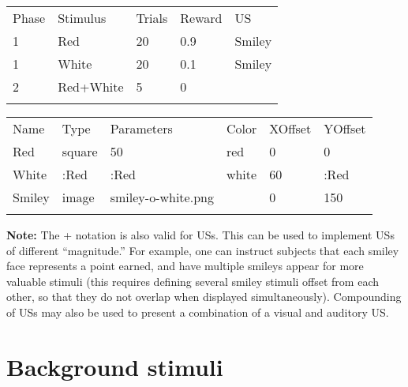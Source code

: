 \documentclass[11pt,]{article}
\renewcommand{\medskip}{}
\begin{document}
\begin{table*}[t]\begin{center}\small\begin{tabular}{@{}lllll@{}}
\hline\noalign{\medskip}
Phase & Stimulus & Trials & Reward & US
\\\noalign{\medskip}
\hline\noalign{\medskip}
1 & Red & 20 & 0.9 & Smiley
\\\noalign{\medskip}
1 & White & 20 & 0.1 & Smiley
\\\noalign{\medskip}
2 & Red+White & 5 & 0 &
\\\noalign{\medskip}
\hline
\noalign{\medskip}
\end{tabular}\caption{A \texttt{Phases.csv} file with a compound stimulus in phase 2.
\label{phases-plus}}
\end{center}\end{table*}

\begin{table*}[t]\begin{center}\small\begin{tabular}{@{}llllll@{}}
\hline\noalign{\medskip}
Name & Type & Parameters & Color & XOffset & YOffset
\\\noalign{\medskip}
\hline\noalign{\medskip}
Red & square & 50 & red & 0 & 0
\\\noalign{\medskip}
White & :Red & :Red & white & 60 & :Red
\\\noalign{\medskip}
Smiley & image & smiley-o-white.png & & 0 & 150
\\\noalign{\medskip}
\hline
\noalign{\medskip}
\end{tabular}\caption{A \texttt{Stimuli.csv} file to go with the \texttt{Phases.csv}
file in Table \ref{phases-plus}. Note that we need to offset the white
square, otherwise it would overlap with the red one when the two are
presented together. \label{stimuli-plus}}
\end{center}\end{table*}

\textbf{Note:} The + notation is also valid for USs. This can be used to
implement USs of different ``magnitude.'' For example, one can instruct
subjects that each smiley face represents a point earned, and have
multiple smileys appear for more valuable stimuli (this requires
defining several smiley stimuli offset from each other, so that they do
not overlap when displayed simultaneously). Compounding of USs may also
be used to present a combination of a visual and auditory US.

\section{Background stimuli}
\end{document}
